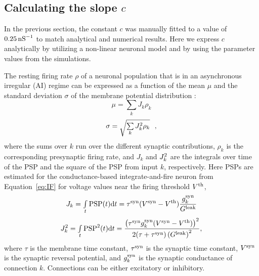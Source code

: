 %

  \subsection{Calculating the slope $c$}
    In the previous section, the constant $c$ was manually fitted to a value of
    $0.25 \, {\rm nS}^{-1}$ to match analytical and numerical results. Here we
    express $c$ analytically by utilizing a non-linear neuronal model and by
    using the parameter values from the simulations.

    The resting firing rate $\rho$ of a neuronal population that is in an
    asynchronous irregular (AI) regime can be expressed as a function of the
    mean $\mu$ and the standard deviation $\sigma$ of the membrane potential
    distribution \citep{Ricciardi2013, Amit1997, Brunel2000, Gerstner2002}:
    \[
      \mu = \sum_{k} J_k \rho_k
    \]
    \begin{equation}
      \sigma = \sqrt{\sum_{k} J^{\rm 2}_k \rho_k} \,\,\,\,,
    \label{eq:sigma_general}
    \end{equation}
    where the sums over $k$ run over the different synaptic contributions,
    $\rho_k$ is the corresponding presynaptic firing rate, and $J_k$ and
    $J^{\rm 2}_k$ are the integrals over time of the PSP and the square of the
    PSP from input $k$, respectively. Here PSPs are estimated for the
    conductance-based integrate-and-fire neuron from Equation~\ref{eq:IF} for voltage
    values near the firing threshold $V^{\rm th}$,
    \[
      J_k = \int_t{ \rm PSP}(t){\rm d} t = \tau^{\rm syn} (V^{\rm syn} - V^{\rm th}) \frac{g_k^{\rm syn}}{G^{\rm leak}}
    \]
    \[
      J^{2}_k = \int_t{ {\rm PSP}^2(t)}{\rm d}t = \frac{\left(\tau^{\rm syn} g_k^{\rm syn} (V^{\rm syn} - V^{\rm th}) \right)^2}{2(\tau + \tau^{\rm syn}) \left(G^{\rm leak} \right)^2} ,
    \]
    where $\tau$ is the membrane time constant, $\tau^{\rm syn}$ is the
    synaptic time constant, $V^{\rm syn}$ is the synaptic reversal potential,
    and $g_k^{\rm syn}$ is the synaptic conductance of connection $k$.
    Connections can be either excitatory or inhibitory.

